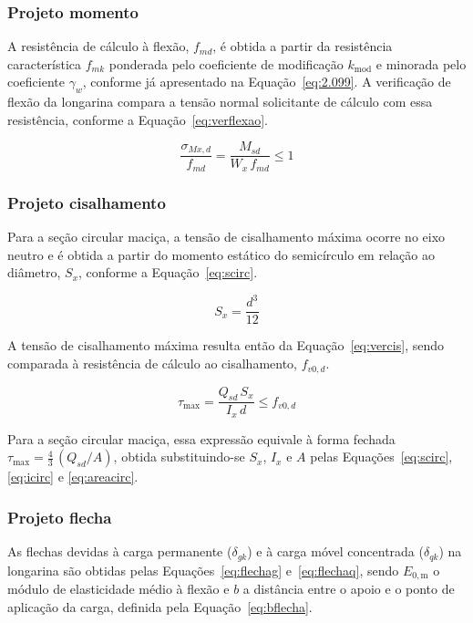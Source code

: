 \subsubsection{Projeto momento}

A resistência de cálculo à flexão, $f_{md}$, é obtida a partir da resistência característica $f_{mk}$ ponderada pelo coeficiente de modificação $k_{\mathrm{mod}}$ e minorada pelo coeficiente $\gamma_w$, conforme já apresentado na Equação~\eqref{eq:2.099}.
A verificação de flexão da longarina compara a tensão normal solicitante de cálculo com essa resistência, conforme a Equação~\eqref{eq:verflexao}.

\begin{equation}
\frac{\sigma_{Mx,d}}{f_{md}} = \frac{M_{sd}}{W_x\,f_{md}} \leq 1
\label{eq:verflexao}
\end{equation}

\subsubsection{Projeto cisalhamento}

Para a seção circular maciça, a tensão de cisalhamento máxima ocorre no eixo neutro e é obtida a partir do momento estático do semicírculo em relação ao diâmetro, $S_x$, conforme a Equação~\eqref{eq:scirc}.

\begin{equation}
S_x = \frac{d^3}{12}
\label{eq:scirc}
\end{equation}

A tensão de cisalhamento máxima resulta então da Equação~\eqref{eq:vercis}, sendo comparada à resistência de cálculo ao cisalhamento, $f_{v0,d}$.

\begin{equation}
\tau_{\max} = \frac{Q_{sd}\,S_x}{I_x\,d} \leq f_{v0,d}
\label{eq:vercis}
\end{equation}

Para a seção circular maciça, essa expressão equivale à forma fechada $\tau_{\max} = \tfrac{4}{3}\,(Q_{sd}/A)$, obtida substituindo-se $S_x$, $I_x$ e $A$ pelas Equações~\eqref{eq:scirc}, \eqref{eq:icirc} e \eqref{eq:areacirc}.

\subsubsection{Projeto flecha}

As flechas devidas à carga permanente ($\delta_{gk}$) e à carga móvel concentrada ($\delta_{qk}$) na longarina são obtidas pelas Equações~\eqref{eq:flechag} e~\eqref{eq:flechaq}, sendo $E_{0,\mathrm{m}}$ o módulo de elasticidade médio à flexão e $b$ a distância entre o apoio e o ponto de aplicação da carga, definida pela Equação~\eqref{eq:bflecha}.

